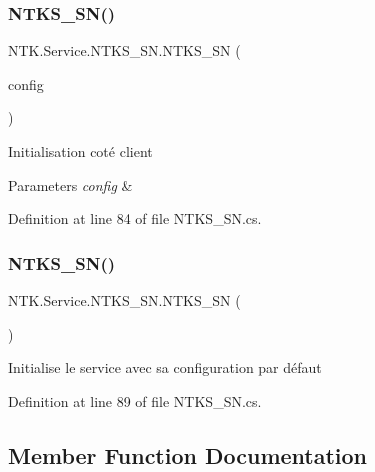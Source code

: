\subsubsection{\texorpdfstring{NTKS\_SN()}{NTKS\_SN()}\hspace{0.1cm}{\footnotesize\ttfamily [2/3]}}
{\footnotesize\ttfamily N\+T\+K.\+Service.\+N\+T\+K\+S\+\_\+\+S\+N.\+N\+T\+K\+S\+\_\+\+SN (\begin{DoxyParamCaption}\item[{\mbox{\hyperlink{struct_n_t_k_1_1_service_1_1_service_config}{Service\+Config}}}]{config }\end{DoxyParamCaption})}



Initialisation coté client 


\begin{DoxyParams}{Parameters}
{\em config} & \\
\hline
\end{DoxyParams}


Definition at line 84 of file N\+T\+K\+S\+\_\+\+S\+N.\+cs.

\mbox{\label{class_n_t_k_1_1_service_1_1_n_t_k_s___s_n_a4dcb0163e4065b4e0595de63c83f4a0d}} 
\subsubsection{\texorpdfstring{NTKS\_SN()}{NTKS\_SN()}\hspace{0.1cm}{\footnotesize\ttfamily [3/3]}}
{\footnotesize\ttfamily N\+T\+K.\+Service.\+N\+T\+K\+S\+\_\+\+S\+N.\+N\+T\+K\+S\+\_\+\+SN (\begin{DoxyParamCaption}{ }\end{DoxyParamCaption})}



Initialise le service avec sa configuration par défaut 



Definition at line 89 of file N\+T\+K\+S\+\_\+\+S\+N.\+cs.



\subsection{Member Function Documentation}
\mbox{\label{class_n_t_k_1_1_service_1_1_n_t_k_s___s_n_a89a0cae60bc215ccf7b021bb4539eb93}} 
